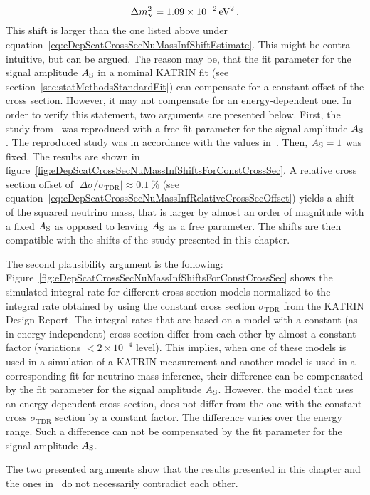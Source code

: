 \begin{equation}
	\Delta m_\upnu^2 = \SI{1.09e-2}{eV^2}
	\text{\,.}
\end{equation}
This shift is larger than the one listed above under equation~\eqref{eq:eDepScatCrossSecNuMassInfShiftEstimate}. This might be contra intuitive, but can be argued. The reason may be, that the fit parameter for the signal amplitude $A_{\mathrm{S}}$ in a nominal KATRIN fit (see section~\ref{sec:statMethodsStandardFit}) can compensate for a constant offset of the cross section. However, it may not compensate for an energy-dependent one. In order to verify this statement, two arguments are presented below.
First, the study from~\cite{Groh2015} was reproduced with a free fit parameter for the signal amplitude $A_{\mathrm{S}}$. The reproduced study was in accordance with the values in~\cite{Groh2015}. Then, $A_{\mathrm{S}}=1$ was fixed. The results are shown in figure~\ref{fig:eDepScatCrossSecNuMassInfShiftsForConstCrossSec}. A relative cross section offset of $
\left|
	\Delta\sigma/\sigma_\mathrm{TDR}
\right| \approx \SI{0.1}{\percent}
$ (see equation~\ref{eq:eDepScatCrossSecNuMassInfRelativeCrossSecOffset}) yields a shift of the squared neutrino mass, that is larger by almost an order of magnitude with a fixed $A_{\mathrm{S}}$ as opposed to leaving $A_{\mathrm{S}}$ as a free parameter. The shifts are then compatible with the shifts of the study presented in this chapter.

The second plausibility argument is the following: Figure~\ref{fig:eDepScatCrossSecNuMassInfShiftsForConstCrossSec} shows the simulated integral rate for different cross section models normalized to the integral rate obtained by using the constant cross section $\sigma_\mathrm{TDR}$ from the KATRIN Design Report. The integral rates that are based on a model with a constant (as in energy-independent) cross section differ from each other by almost a constant factor (variations $<2\times10^{-4}$ level). This implies, when one of these models is used in a simulation of a KATRIN measurement and another model is used in a corresponding fit for neutrino mass inference, their difference can be compensated by the fit parameter for the signal amplitude $A_{\mathrm{S}}$. However, the model that uses an energy-dependent cross section, does not differ from the one with the constant cross $\sigma_\mathrm{TDR}$ section by a constant factor. The difference varies over the energy range. Such a difference can not be compensated by the fit parameter for the signal amplitude $A_{\mathrm{S}}$.

The two presented arguments show that the results presented in this chapter and the ones in~\cite{Groh2015} do not necessarily contradict each other.

